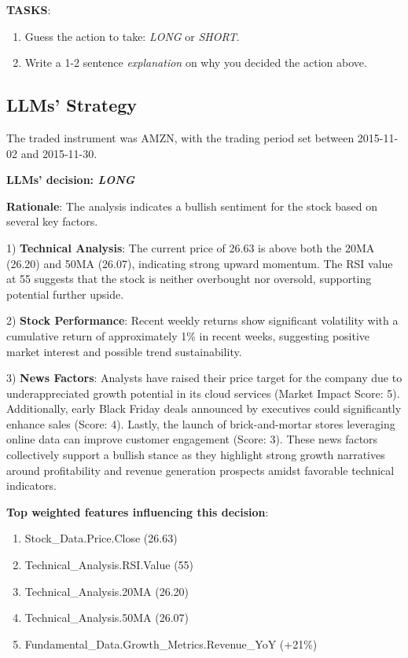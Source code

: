 \documentclass[8pt]{scrartcl}
\begin{document}
\textbf{TASKS}:

\begin{tcolorbox}[colback=blue!10, colframe=blue!60, title=\textbf{TASKS}, sharp corners=southwest]
\begin{enumerate}
    \item Guess the action to take: \textit{LONG} or \textit{SHORT}.
    \item Write a 1-2 sentence \textit{explanation} on why you decided the action above.
\end{enumerate}
\end{tcolorbox}

\newpage

\subsection*{LLMs' Strategy} \label{strategy7}

The traded instrument was AMZN, with the trading period set between 2015-11-02 and 2015-11-30.

\textbf{LLMs' decision: \textit{LONG}}

\textbf{Rationale}: The analysis indicates a bullish sentiment for the stock based on several key factors.

1) \textbf{Technical Analysis}: The current price of 26.63 is above both the 20MA (26.20) and 50MA (26.07), indicating strong upward momentum. The RSI value at 55 suggests that the stock is neither overbought nor oversold, supporting potential further upside.

2) \textbf{Stock Performance}: Recent weekly returns show significant volatility with a cumulative return of approximately 1\% in recent weeks, suggesting positive market interest and possible trend sustainability.

3) \textbf{News Factors}: Analysts have raised their price target for the company due to underappreciated growth potential in its cloud services (Market Impact Score: 5). Additionally, early Black Friday deals announced by executives could significantly enhance sales (Score: 4). Lastly, the launch of brick-and-mortar stores leveraging online data can improve customer engagement (Score: 3). These news factors collectively support a bullish stance as they highlight strong growth narratives around profitability and revenue generation prospects amidst favorable technical indicators.

\textbf{Top weighted features influencing this decision}:
\begin{enumerate}
    \item Stock\_Data.Price.Close (26.63)
    \item Technical\_Analysis.RSI.Value (55)
    \item Technical\_Analysis.20MA (26.20)
    \item Technical\_Analysis.50MA (26.07)
    \item Fundamental\_Data.Growth\_Metrics.Revenue\_YoY (+21\%)
\end{enumerate}
\end{document}
